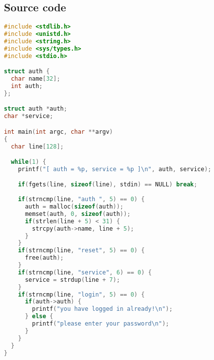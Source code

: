 \subsection*{Source code}

\begin{lstlisting}[language=c]
#include <stdlib.h>
#include <unistd.h>
#include <string.h>
#include <sys/types.h>
#include <stdio.h>

struct auth {
  char name[32];
  int auth;
};

struct auth *auth;
char *service;

int main(int argc, char **argv)
{
  char line[128];

  while(1) {
    printf("[ auth = %p, service = %p ]\n", auth, service);

    if(fgets(line, sizeof(line), stdin) == NULL) break;
    
    if(strncmp(line, "auth ", 5) == 0) {
      auth = malloc(sizeof(auth));
      memset(auth, 0, sizeof(auth));
      if(strlen(line + 5) < 31) {
        strcpy(auth->name, line + 5);
      }
    }
    if(strncmp(line, "reset", 5) == 0) {
      free(auth);
    }
    if(strncmp(line, "service", 6) == 0) {
      service = strdup(line + 7);
    }
    if(strncmp(line, "login", 5) == 0) {
      if(auth->auth) {
        printf("you have logged in already!\n");
      } else {
        printf("please enter your password\n");
      }
    }
  }
}
\end{lstlisting}
